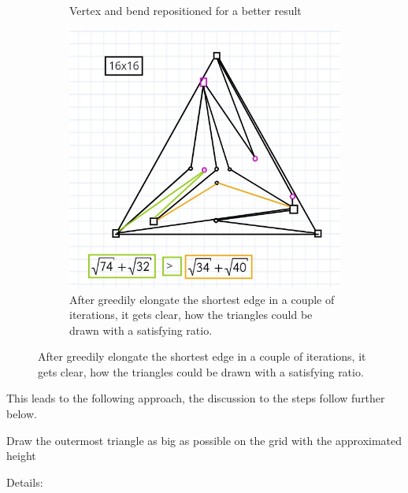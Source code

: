 \begin{figure}[H]
\begin{subfigure}{0.8\textwidth}
	\caption{Vertex and bend repositioned for a better result}
\end{subfigure}
	\begin{subfigure}{0.8\textwidth}
	\centering
	\includegraphics[width=0.5\linewidth]{drawings/two_triangles_4.jpg}
	\caption{After greedily elongate the shortest edge in a couple of iterations, it gets clear, how the triangles could be drawn with a satisfying ratio.}
\end{subfigure}
\end{figure}
This leads to the following approach, the discussion to the steps follow further below.
\begin{algorithm}[H]
	Draw the outermost triangle as big as possible on the grid with the approximated height\\
\caption{Algorithm sketch for a drawing of the example graph}
\end{algorithm}
Details:
